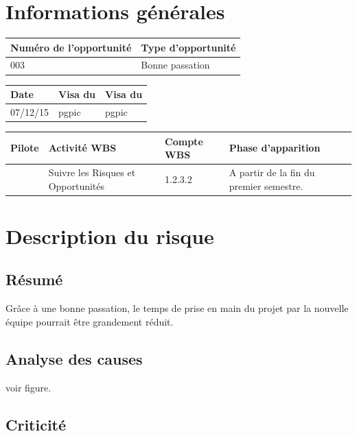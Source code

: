 \section*{Informations générales}
 
\begin{table}[h]
\centering
	\begin{tabularx}{16.8cm}{|X|X|}
	\hline
	Numéro de l'opportunité & Type d'opportunité \\
	\hline
	003 & Bonne passation \\
	\hline
	\end{tabularx}
\end{table}

\begin{table}[h]
\centering
	\begin{tabularx}{16.8cm}{|X|X|X|}
	\hline
	Date & Visa du \RQ & Visa du \CP \\
	\hline
	 07/12/15 & pgpic & pgpic \\
	\hline
	\end{tabularx}
\end{table}

\begin{table}[h]
\centering
	\begin{tabularx}{16.8cm}{|X|X|X|X|}
	\hline
	Pilote & Activité WBS & Compte WBS & Phase d'apparition \\
	\hline
	 \Pierre & Suivre les Risques et Opportunités & 1.2.3.2 & A partir de la fin du premier semestre.\\
	\hline
	\end{tabularx}
\end{table}

\section*{Description du risque}

\subsection*{Résumé}
	Grâce à une bonne passation, le temps de prise en main du projet par la nouvelle équipe pourrait être grandement réduit.
	
\subsection*{Analyse des causes}
	voir figure.

\subsection*{Criticité}


